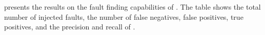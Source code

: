 % 


  presents the results on the fault finding capabilities of \jseft.
The table shows the total number of injected faults, the number of false negatives, false positives, true positives, and the precision and recall of \jseft. 

